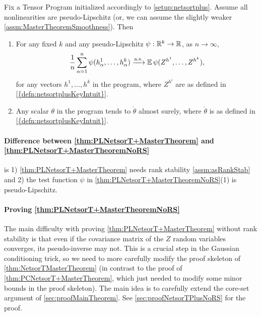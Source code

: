 \documentclass[main.tex]{subfiles}
\begin{document}
\begin{thm}
    \label{thm:PLNetsorT+MasterTheoremNoRS} Fix a Tensor Program initialized accordingly to \cref{setup:netsortplus}.
    Assume all nonlinearities are pseudo-Lipschitz (or, we can assume the slightly weaker \cref{assm:MasterTheoremSmoothness}).
    Then 
    \begin{enumerate}
    \item For any fixed $k$ and any pseudo-Lipschitz $\psi:\mathbb{R}^{k}\to\mathbb{R}$, as $n\to\infty$,
    \begin{equation*}
    \frac{1}{n}\sum_{\alpha=1}^{n}\psi(h_{\alpha}^{1},\ldots,h_{\alpha}^{k})\xrightarrow{\mathrm{a.s.}}\operatorname*{\mathbb{E}}\psi(Z^{h^{1}},\ldots,Z^{h^{k}}),
    \end{equation*}
    for any vectors $h^{1},\ldots,h^{k}$ in the program, where $Z^{h^{i}}$ are as defined in \cref{{defn:netsortplusKeyIntuit}}.
    \item Any scalar $\theta$ in the program tends to $\mathring{\theta}$ almost surely, where $\mathring{\theta}$ is as defined in \cref{{defn:netsortplusKeyIntuit}}.
    \end{enumerate}
\end{thm}

\paragraph{Difference between \cref{thm:PLNetsorT+MasterTheorem} and \cref{thm:PLNetsorT+MasterTheoremNoRS}}
is 1) \cref{thm:PLNetsorT+MasterTheorem} needs rank stability \cref{assm:asRankStab} and 2) the test function $\psi$ in \cref{thm:PLNetsorT+MasterTheoremNoRS}(1) is pseudo-Lipschitz.

\paragraph{Proving \cref{thm:PLNetsorT+MasterTheoremNoRS}}
The main difficulty with proving \cref{thm:PLNetsorT+MasterTheorem} without rank stability is that even if the covariance matrix of the $Z$ random variables converges, its pseudo-inverse may not.
This is a crucial step in the Gaussian conditioning trick, so we need to more carefully modify the proof skeleton of \cref{thm:NetsorTMasterTheorem} (in contrast to the proof of \cref{thm:PCNetsorT+MasterTheorem}, which just needed to modify some minor bounds in the proof skeleton).
The main idea is to carefully extend the core-set argument of \cref{sec:proofMainTheorem}.
See \cref{sec:proofNetsorTPlusNoRS} for the proof.
\end{document}
